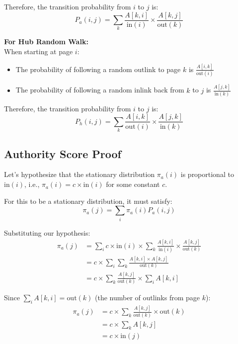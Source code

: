 \documentclass{article}
\begin{document}
Therefore, the transition probability from $i$ to $j$ is:
\begin{equation}
    P_a(i,j) = \sum_k \frac{A[k,i]}{\text{in}(i)} \times \frac{A[k,j]}{\text{out}(k)}
\end{equation}

\textbf{For Hub Random Walk:}\\
When starting at page $i$:
\begin{itemize}
    \item The probability of following a random outlink to page $k$ is $\frac{A[i,k]}{\text{out}(i)}$
    \item The probability of following a random inlink back from $k$ to $j$ is $\frac{A[j,k]}{\text{in}(k)}$
\end{itemize}

Therefore, the transition probability from $i$ to $j$ is:
\begin{equation}
    P_h(i,j) = \sum_k \frac{A[i,k]}{\text{out}(i)} \times \frac{A[j,k]}{\text{in}(k)}
\end{equation}

\subsection{Authority Score Proof}

Let's hypothesize that the stationary distribution $\pi_a(i)$ is proportional to $\text{in}(i)$, i.e., $\pi_a(i) = c \times \text{in}(i)$ for some constant $c$.

For this to be a stationary distribution, it must satisfy:
\begin{equation}
    \pi_a(j) = \sum_i \pi_a(i) P_a(i,j)
\end{equation}

Substituting our hypothesis:
\begin{align}
    \pi_a(j) &= \sum_i c \times \text{in}(i) \times \sum_k \frac{A[k,i]}{\text{in}(i)} \times \frac{A[k,j]}{\text{out}(k)}\\
    &= c \times \sum_i \sum_k \frac{A[k,i] \times A[k,j]}{\text{out}(k)}\\
    &= c \times \sum_k \frac{A[k,j]}{\text{out}(k)} \times \sum_i A[k,i]
\end{align}

Since $\sum_i A[k,i] = \text{out}(k)$ (the number of outlinks from page $k$):
\begin{align}
    \pi_a(j) &= c \times \sum_k \frac{A[k,j]}{\text{out}(k)} \times \text{out}(k)\\
    &= c \times \sum_k A[k,j]\\
    &= c \times \text{in}(j)
\end{align}
\end{document}
